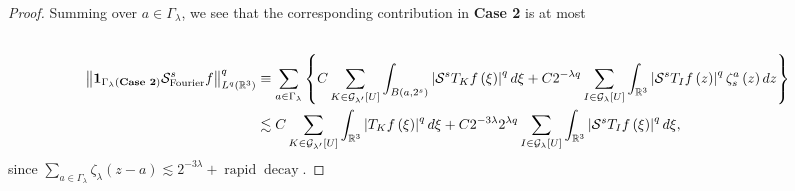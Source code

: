 \documentclass{amsart}%
\theoremstyle{plain}
\numberwithin{equation}{section}
\begin{document}
\begin{proof}
Summing over $a\in\Gamma_{\lambda}$, we see that the corresponding
contribution in \textbf{Case 2} is at most%
\begin{align}
& \label{contrib Case 2}\\
\left\Vert \mathbf{1}_{\Gamma_{\lambda}\left(  \text{\textbf{Case 2}}\right)
}\mathcal{S}_{\operatorname*{Fourier}}^{s}f\right\Vert _{L^{q}\left(
\mathbb{R}^{3}\right)  }^{q}  &  \equiv\sum_{a\in\Gamma_{\lambda}}\left\{
C\sum_{K\in\mathcal{G}_{\lambda^{\prime}}\left[  U\right]  }\int_{B\left(
a,2^{s}\right)  }\left\vert \mathcal{S}^{s}T_{K}f\left(  \xi\right)
\right\vert ^{q}d\xi+C2^{-\lambda q}\sum_{I\in\mathcal{G}_{\lambda}\left[
U\right]  }\int_{\mathbb{R}^{3}}\left\vert \mathcal{S}^{s}T_{I}f\left(
z\right)  \right\vert ^{q}\zeta_{s}^{a}\left(  z\right)  dz\right\}
\nonumber\\
&  \lesssim C\sum_{K\in\mathcal{G}_{\lambda^{\prime}}\left[  U\right]  }%
\int_{\mathbb{R}^{3}}\left\vert T_{K}f\left(  \xi\right)  \right\vert ^{q}%
d\xi+C2^{-3\lambda}2^{\lambda q}\sum_{I\in\mathcal{G}_{\lambda}\left[
U\right]  }\int_{\mathbb{R}^{3}}\left\vert \mathcal{S}^{s}T_{I}f\left(
\xi\right)  \right\vert ^{q}d\xi,\nonumber
\end{align}
since $\sum_{a\in\Gamma_{\lambda}}\zeta_{\lambda}\left(  z-a\right)
\lesssim2^{-3\lambda}+\operatorname*{rapid}\operatorname*{decay}$.


\end{proof}
\end{document}
